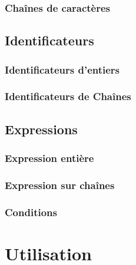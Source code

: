 \documentclass[11pt,a4paper,titlepage,openany]{book}
\begin{document}
             \subsection{Chaînes de caractères}
                

        \section{Identificateurs}
             

             \subsection{Identificateurs d'entiers}
                

             \subsection{Identificateurs de Chaînes}
                

        \section{Expressions}
            

            \subsection{Expression entière}
                

            \subsection{Expression sur chaînes}
                

            \subsection{Conditions}
                

    \chapter{Utilisation}
        
\end{document}

